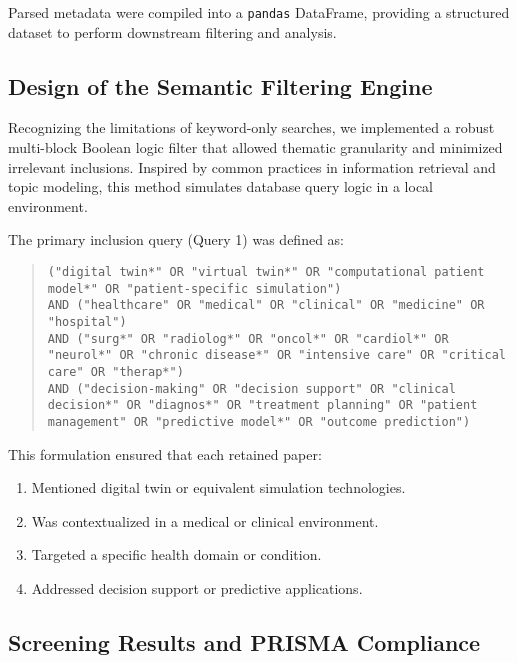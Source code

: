 \documentclass[10pt,a4paper]{article}
\begin{document}
Parsed metadata were compiled into a \texttt{pandas} DataFrame, providing a structured dataset to perform downstream filtering and analysis.

\subsection*{Design of the Semantic Filtering Engine}

Recognizing the limitations of keyword-only searches, we implemented a robust multi-block Boolean logic filter that allowed thematic granularity and minimized irrelevant inclusions. Inspired by common practices in information retrieval and topic modeling, this method simulates database query logic in a local environment.

The primary inclusion query (Query 1) was defined as:

\begin{quote}
\texttt{("digital twin*" OR "virtual twin*" OR "computational patient model*" OR "patient-specific simulation")} \\
\texttt{AND ("healthcare" OR "medical" OR "clinical" OR "medicine" OR "hospital")} \\
\texttt{AND ("surg*" OR "radiolog*" OR "oncol*" OR "cardiol*" OR "neurol*" OR "chronic disease*" OR "intensive care" OR "critical care" OR "therap*")} \\
\texttt{AND ("decision-making" OR "decision support" OR "clinical decision*" OR "diagnos*" OR "treatment planning" OR "patient management" OR "predictive model*" OR "outcome prediction")}
\end{quote}

This formulation ensured that each retained paper:
\begin{enumerate}
    \item Mentioned digital twin or equivalent simulation technologies.
    \item Was contextualized in a medical or clinical environment.
    \item Targeted a specific health domain or condition.
    \item Addressed decision support or predictive applications.
\end{enumerate}




\subsection*{Screening Results and PRISMA Compliance}
\end{document}
